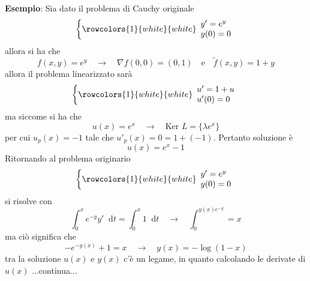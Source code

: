 \documentclass[a4paper]{extarticle}
\newcommand*\dif{\mathop{}\!\mathrm{d}}
\begin{document}
\vspace{2em}
\noindent
\textbf{Esempio}: Sia dato il problema di Cauchy originale
\[\left\{
    \rowcolors{1}{white}{white}
    \begin{array}{lll}
        y'=e^y\\
        y(0)=0
    \end{array}
\right.\]
allora si ha che
\[f(x,y)=e^y \hspace{1em} \rightarrow \hspace{1em} \nabla f(0,0) = (0,1) \hspace{1em} \text{e} \hspace{1em} \widetilde{f}(x,y) = 1+ y\]
allora il problema linearizzato sarà
\[\left\{
    \rowcolors{1}{white}{white}
    \begin{array}{lll}
        u'=1+u\\
        u'(0)=0
    \end{array}
\right.\]
ma siccome si ha che
\[u(x)=e^x \hspace{1em} \rightarrow \hspace{1em} \text{Ker } L = \{\lambda e^x\}\]
per cui $u_p(x)=-1$ tale che $u'_p(x) = 0 = 1+(-1)$. Pertanto soluzione è
\[u(x)=e^x-1\]
Ritornando al problema originario 
\[\left\{
    \rowcolors{1}{white}{white}
    \begin{array}{lll}
        y'=e^y\\
        y(0)=0
    \end{array}
\right.\]
si risolve con
\[\int_0^x e^{-y} y' \dif t = \int_0^x 1 \dif t \hspace{1em} \rightarrow \hspace{1em} \int_0^{y(x) e^{-y}} = x\]
ma ciò significa che
\[-e^{-y(x)} + 1 = x \hspace{1em} \rightarrow \hspace{1em} y(x)=-\log(1-x)\]
tra la soluzione $u(x)$ e $y(x)$ c'è un legame, in quanto calcolando le derivate di $u(x)$ ...continua...

\vspace{1em}
\end{document}
